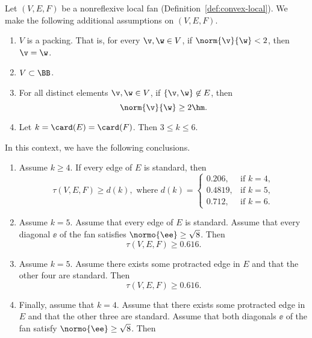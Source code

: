 \begin{theorem}\label{lemma:main-estimate}
Let $(V,E,F)$ be a nonreflexive local fan (Definition~\ref{def:convex-local}).
We make the following additional
assumptions on $(V,E,F)$.
\begin{enumerate}
\item {} $V$ is a packing.  That is, for every $\v,\w\in
V$, if $\norm{\v}{\w}<2$, then $\v=\w$.
\item {} $V\subset \BB$.
\item {} For all distinct elements $\v,\w\in V$, if
$\{\v,\w\}\not\in E$, then 
\[ 
\norm{\v}{\w}\ge 2\hm.
\] 
\item {} 
Let   $k=\card(E)=\card(F)$.  Then $3\le k \le 6$.
\end{enumerate}
In this context, we have the following conclusions.
\begin{enumerate}
\item Assume $k\ge 4$.  If  every edge of $E$ is standard, then
\[ 
\tau(V,E,F) \ge d (k), \text{ where } d(k) =
\begin{cases}
  0.206,&\text{if }k=4,\\
  0.4819,&\text{if }k=5,\\
  0.712,&\text{if }k=6.
\end{cases}
\] 
\item Assume $k=5$.  Assume that every edge of $E$ is standard.
Assume that every diagonal $\ee$ of the fan satisfies $\normo{\ee}\ge\sqrt{8}$.
Then 
\begin{equation}
\tau(V,E,F)\ge 0.616. \tag{check:pent\_diag\_cs}
\end{equation}
\item Assume $k=5$.  Assume there exists some protracted edge in $E$ 
and that the other four are standard.  Then 
\begin{equation}
\tau(V,E,F)\ge 0.616. \tag{check:pent\_pro\_cs}
\end{equation}
\item Finally, assume that $k=4$.  Assume that there exists some protracted
 edge in $E$ and that the other three are standard.  
Assume that both diagonals $\ee$ of the fan satisfy $\normo{\ee}\ge\sqrt{8}$.
Then
\begin{equation}

\end{equation}
\end{enumerate}
\end{theorem}
